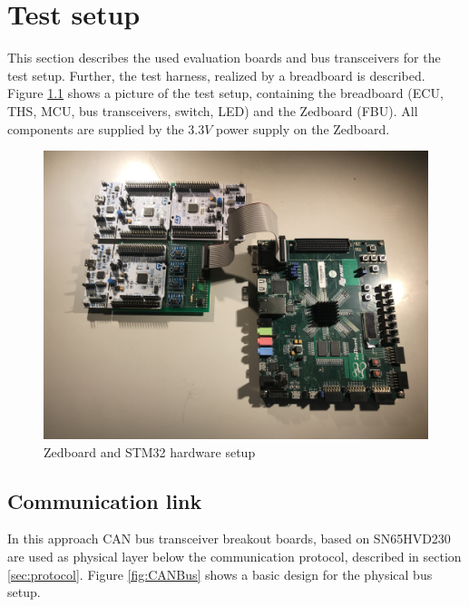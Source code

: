 \chapter{Test setup}

This section describes the used evaluation boards and bus transceivers for the test setup. Further, the test harness, realized by a breadboard is described. 
Figure \ref{fig:setup} shows a picture of the test setup, containing the breadboard (\gls{ECU}, \gls{THS}, \gls{MCU}, bus transceivers, switch, LED) and the Zedboard (\gls{FBU}). All components are supplied by the $3.3V$ power supply on the Zedboard.

\begin{figure}[h!]
    \centering
    \includegraphics[width=\textwidth]{figures/hw_setup.jpg}
    \caption{Zedboard and STM32 hardware setup}\label{fig:setup}
\end{figure}

\section{Communication link}
\label{sec:communication_link}
In this approach CAN bus transceiver breakout boards, based on SN65HVD230 \cite{CANTransceiver} are used as physical layer below the communication protocol, described in section \ref{sec:protocol}. Figure \ref{fig:CANBus} shows a basic design for the physical bus setup.

